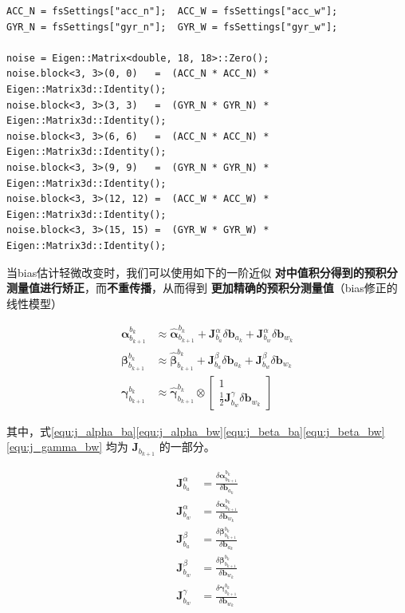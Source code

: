 \documentclass[12pt,a4paper]{article}
\begin{document}
\begin{lstlisting}
ACC_N = fsSettings["acc_n"];  ACC_W = fsSettings["acc_w"];
GYR_N = fsSettings["gyr_n"];  GYR_W = fsSettings["gyr_w"];

noise = Eigen::Matrix<double, 18, 18>::Zero();
noise.block<3, 3>(0, 0)   =  (ACC_N * ACC_N) * Eigen::Matrix3d::Identity();
noise.block<3, 3>(3, 3)   =  (GYR_N * GYR_N) * Eigen::Matrix3d::Identity();
noise.block<3, 3>(6, 6)   =  (ACC_N * ACC_N) * Eigen::Matrix3d::Identity();
noise.block<3, 3>(9, 9)   =  (GYR_N * GYR_N) * Eigen::Matrix3d::Identity();
noise.block<3, 3>(12, 12) =  (ACC_W * ACC_W) * Eigen::Matrix3d::Identity();
noise.block<3, 3>(15, 15) =  (GYR_W * GYR_W) * Eigen::Matrix3d::Identity();
\end{lstlisting}

当bias估计轻微改变时，我们可以使用如下的一阶近似 \textbf{对中值积分得到的预积分测量值进行矫正}，而\textbf{不重传播}，从而得到 \textbf{更加精确的预积分测量值}（bias修正的线性模型）

\begin{equation}
\begin{aligned} 
\boldsymbol{\alpha}_{b_{k+1}}^{b_{k}} & \approx 
\hat{\boldsymbol{\alpha}}_{b_{k+1}}^{b_{k}}+
\mathbf{J}_{b_{a}}^{\alpha} \delta \mathbf{b}_{a_{k}}+
\mathbf{J}_{b_{w}}^{\alpha} \delta \mathbf{b}_{w_{k}} \\ 
\boldsymbol{\beta}_{b_{k+1}}^{b_{k}} & \approx 
\hat{\boldsymbol{\beta}}_{b_{k+1}}^{b_{k}}+
\mathbf{J}_{b_{a}}^{\beta} \delta \mathbf{b}_{a_{k}}+
\mathbf{J}_{b_{w}}^{\beta} \delta \mathbf{b}_{w_{k}} \\ 
\boldsymbol{\gamma}_{b_{k+1}}^{b_{k}} & \approx 
\hat{\boldsymbol{\gamma}}_{b_{k+1}}^{b_{k}} \otimes
\left[\begin{array}{c}{1} \\ 
{\frac{1}{2} \mathbf{J}_{b_{w}}^{\gamma} \delta \mathbf{b}_{w_{k}}}\end{array}\right] 
\end{aligned}
\end{equation}

其中，式\eqref{equ:j_alpha_ba}\eqref{equ:j_alpha_bw}\eqref{equ:j_beta_ba}\eqref{equ:j_beta_bw}\eqref{equ:j_gamma_bw} 均为 $\mathbf{J}_{b_{k+1}}$ 的一部分。

\begin{align}
\label{equ:j_alpha_ba}
\mathbf{J}_{b_{a}}^{\alpha}&=
\frac{\delta \boldsymbol{\alpha}_{b_{k+1}}^{b_{k}}}{\delta \mathbf{b}_{a_{k}}} \\
\label{equ:j_alpha_bw}
\mathbf{J}_{b_{w}}^{\alpha}&= 
\frac{\delta \boldsymbol{\alpha}_{b_{k+1}}^{b_{k}}}{\delta \mathbf{b}_{w_{k}}} \\
\label{equ:j_beta_ba}
\mathbf{J}_{b_{a}}^{\beta}&=
\frac{\delta \boldsymbol{\beta}_{b_{k+1}}^{b_{k}}}{\delta \mathbf{b}_{a_{k}}} \\
\label{equ:j_beta_bw}
\mathbf{J}_{b_{w}}^{\beta}&=
\frac{\delta \boldsymbol{\beta}_{b_{k+1}}^{b_{k}}}{\delta \mathbf{b}_{w_{k}}} \\
\label{equ:j_gamma_bw}
\mathbf{J}_{b_{w}}^{\gamma}&=
\frac{\delta \boldsymbol{\gamma}_{b_{k+1}}^{b_{k}}}{\delta \mathbf{b}_{w_{k}}}
\end{align}
\end{document}
